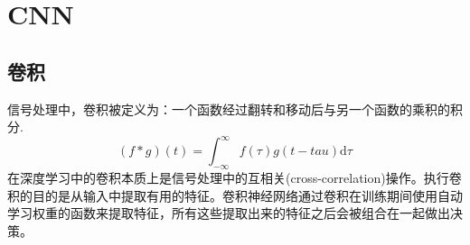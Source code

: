 \section{CNN}
\subsection{卷积}
信号处理中，卷积被定义为：一个函数经过翻转和移动后与另一个函数的乘积的积分.
\begin{equation}
	(f*g)(t)=\int_{-\infty}^{\infty} f(\tau)g(t-tau)\mathrm{d}\tau 
\end{equation}
在深度学习中的卷积本质上是信号处理中的互相关(cross-correlation)操作。执行卷积的目的是从输入中提取有用的特征。卷积神经网络通过卷积在训练期间使用自动学习权重的函数来提取特征，所有这些提取出来的特征之后会被组合在一起做出决策。

